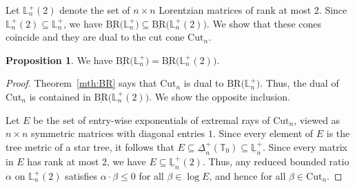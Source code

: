 \documentclass{amsart}
\theoremstyle{definition}
\newtheorem{proposition}[theorem]{Proposition}
\theoremstyle{remark}
\def\RR{\mathbb{R}}
\def\T{\mathbb{T}}
\def\L{\mathbb{L}}
\def\BR{\mathrm{BR}}
\def\Cut{\mathrm{Cut}}
\begin{document}
Let $\L_n^+(2)$ denote the set of $n\times n$ Lorentzian matrices of rank at most $2$.
Since $\L_n^+(2)\subseteq \L_n^+$, we have 
$\underline{\BR}\bigl(\L_n^+\bigr) \subseteq \underline{\BR}\bigl(\L_n^+(2)\bigr)$.
We show that these cones coincide and they are dual to the cut cone $\Cut_n$.

\begin{proposition}\label{thm:BR_rk2}
We have 
	$
    \underline{\BR}\bigl(\L_n^+\bigr)=
    \underline{\BR}\bigl(\L_n^+(2)\bigr)$.
\end{proposition}

\begin{proof}
Theorem~\ref{mth:BR} says that $\Cut_n$ is dual to  $\underline{\BR}\bigl(\L_n^+\bigr)$. Thus, the dual of  $\Cut_n$ is contained in $\underline{\BR}\bigl(\L_n^+(2)\bigr)$. 
We show the opposite inclusion.





Let  $E$ be the set of entry-wise exponentials of extremal rays of $\Cut_n$, viewed as $n \times n$ symmetric matrices with diagonal entries $1$.
Since every element of $E$ is the tree metric of a star tree, it follows that $E \subseteq \underline{\Delta}_n^+(\T_0) \subseteq \underline{\L}_n^+$. Since every matrix  in $E$ has rank at most 2, we have
$E \subseteq \underline{\L}_n^+(2)$.
Thus, any reduced bounded ratio $\alpha$ on $\L_n^+(2)$ satisfies $\alpha \cdot \beta \le 0$ for all $\beta \in \log E$, and hence for all $\beta \in \Cut_n$. 
\end{proof}
\end{document}
